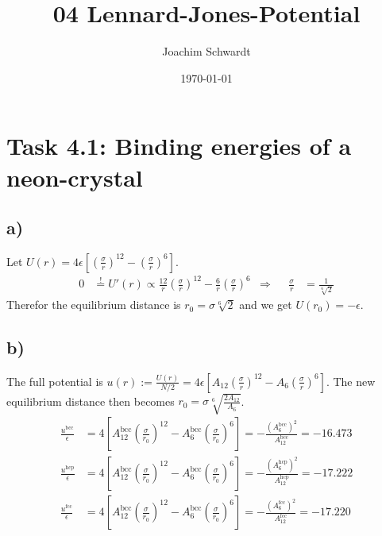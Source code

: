 \documentclass[a4paper,12pt]{article}
\newcommand{\intx}{}
\newcommand{\kla}{}
\newcommand{\klam}{}
\newcommand{\tecxt}{}
\begin{document}
\title{04 Lennard-Jones-Potential}
\author{Joachim Schwardt}
\date{\today}
\maketitle

\section*{Task 4.1: Binding energies of a neon-crystal}
\subsection*{a)}Let $U(r)=4\epsilon\klam\left[ {\kla\left( {\frac{\sigma}{r}} \right)^{12}-\kla\left( {\frac{\sigma}{r}} \right)^6} \right]$. 
\begin{align*}
0&\overset{!}{=}U'(r)\propto \frac{12}{r}\kla\left( {\frac{\sigma}{r}} \right)^{12}-\frac{6}{r}\kla\left( {\frac{\sigma}{r}} \right)^6&\Rightarrow &&\frac{\sigma}{r}&=\frac{1}{\sqrt[6]{2}}
\end{align*}
Therefor the equilibrium distance is $r_0=\sigma\sqrt[6]{2}$ and we get $U(r_0)=-\epsilon$.
\subsection*{b)}The full potential is $u(r):=\frac{U(r)}{N/2}=4\epsilon\klam\left[ {A_{12}\kla\left( {\frac{\sigma}{r}} \right)^{12}-A_6\kla\left( {\frac{\sigma}{r}} \right)^6} \right]$. The new equilibrium distance then becomes $r_0=\sigma\sqrt[6]{\frac{2A_{12}}{A_6}}$. 
\begin{align*}
\frac{u^\tecxt\text{bcc}}{\epsilon}&=4\klam\left[ {A_{12}^\tecxt\text{bcc}\kla\left( {\frac{\sigma}{r_0}} \right)^{12}-A_6^\tecxt\text{bcc}\kla\left( {\frac{\sigma}{r_0}} \right)^6} \right]=-\frac{(A_6^\tecxt\text{bcc})^2}{A_{12}^\tecxt\text{bcc}}=-16.473\\
\frac{u^\tecxt\text{hcp}}{\epsilon}&=4\klam\left[ {A_{12}^\tecxt\text{bcc}\kla\left( {\frac{\sigma}{r_0}} \right)^{12}-A_6^\tecxt\text{bcc}\kla\left( {\frac{\sigma}{r_0}} \right)^6} \right]=-\frac{(A_6^\tecxt\text{hcp})^2}{A_{12}^\tecxt\text{hcp}}=-17.222\\
\frac{u^\tecxt\text{fcc}}{\epsilon}&=4\klam\left[ {A_{12}^\tecxt\text{bcc}\kla\left( {\frac{\sigma}{r_0}} \right)^{12}-A_6^\tecxt\text{bcc}\kla\left( {\frac{\sigma}{r_0}} \right)^6} \right]=-\frac{(A_6^\tecxt\text{fcc})^2}{A_{12}^\tecxt\text{fcc}}=-17.220
\end{align*} 
\end{document}
